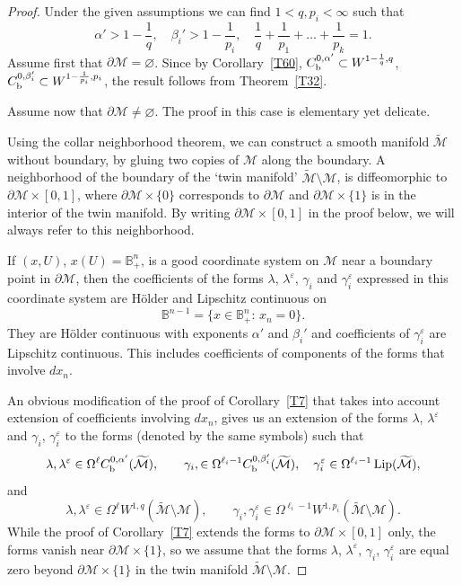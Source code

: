 \documentclass[intlimits,12pt,reqno]{amsart}
\newcommand{\cM}{\mathcal M}
\newcommand{\bbbb}{\mathbb B}
\newcommand{\eps}{\varepsilon}
\numberwithin{equation}{section}
\def\lip{\operatorname{Lip}}
\theoremstyle{definition}
\begin{document}
\begin{proof}
Under the given assumptions we can find $1<q,p_i<\infty$ such that
$$
\alpha'>1-\frac{1}{q},
\quad
\beta_i'>1-\frac{1}{p_i},
\quad
\frac{1}{q}+\frac{1}{p_1}+\ldots+\frac{1}{p_k}=1.
$$
Assume first that $\partial\cM=\varnothing$.
Since by Corollary~\ref{T60},
$C_{\rm b}^{0,\alpha'}\subset W^{1-\frac{1}{q},q}$, $C_{\rm b}^{0,\beta_i'}\subset W^{1-\frac{1}{p_i},p_i}$, the result follows from Theorem~\ref{T32}.

Assume now that $\partial\cM\neq\varnothing$. The proof in this case is elementary yet delicate.

Using the collar neighborhood theorem, we can 
construct a smooth manifold $\widetilde{\cM}$ without boundary, by gluing two copies of $\cM$ along the boundary. 
A neighborhood of the boundary of the `twin manifold' $\widetilde{\cM}\setminus\cM$, is diffeomorphic to $\partial\cM\times[0,1]$, where $\partial\cM\times\{0\}$ corresponds to $\partial\cM$ and $\partial\cM\times\{ 1\}$ is in the interior of the twin manifold. By writing $\partial\cM\times[0,1]$ in the proof below, we will always refer to this neighborhood.

If $(x,U)$, $x(U)=\bbbb^n_+$, is a good coordinate system on $\cM$ near a boundary point in $\partial\cM$, then the coefficients of the forms $\lambda$, $\lambda^\eps$, $\gamma_i$ and $\gamma_i^\eps$  expressed in this coordinate system are H\"older and Lipschitz continuous on
$$
\bbbb^{n-1}=\{x\in\bbbb^n_+:\, x_n=0\}.
$$
They are H\"older continuous with exponents $\alpha'$ and $\beta_i'$ and coefficients of $\gamma_i^\eps$ are Lipschitz continuous. This includes coefficients of components of the forms that involve $dx_n$. 

An obvious modification of the proof of Corollary~\ref{T7} that takes into account extension of coefficients involving $dx_n$, gives us an extension of the forms $\lambda$, $\lambda^\eps$ and $\gamma_i$, $\gamma_i^\eps$ to the forms (denoted by the same symbols) such that
$$
\lambda,\lambda^\eps \in\Omega^\ell C_{\rm b}^{0,\alpha'}(\widetilde{\cM}),
\qquad
\gamma_i,\in \Omega^{\ell_i-1}C_{\rm b}^{0,\beta_i'}(\widetilde{\cM}),
\quad
\gamma_i^\eps\in \Omega^{\ell_i-1}\lip(\widetilde{\cM}),
$$
and
$$
\lambda,\lambda^\eps \in\Omega^\ell W^{1,q}(\widetilde{\cM}\setminus\cM),
\qquad
\gamma_i,\gamma_i^\eps\in \Omega^{\ell_i-1}W^{1,p_i}(\widetilde{\cM}\setminus\cM).
$$
While the proof of Corollary~\ref{T7} extends the forms to $\partial\cM\times[0,1]$ only, the forms vanish near $\partial\cM\times\{1\}$, so we assume that the forms $\lambda$, $\lambda^\eps$, $\gamma_i$, $\gamma_i^\eps$
are equal zero beyond $\partial\cM\times\{1\}$ in the twin manifold $\widetilde{\cM}\setminus\cM$.


\end{proof}
\end{document}
